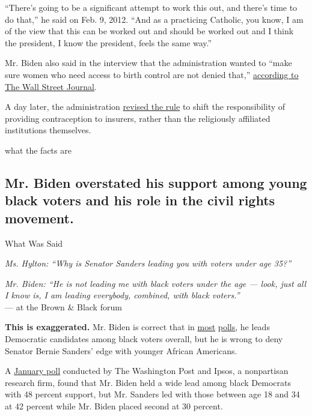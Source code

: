 ``There's going to be a significant attempt to work this out, and
there's time to do that,'' he said on Feb. 9, 2012. ``And as a
practicing Catholic, you know, I am of the view that this can be worked
out and should be worked out and I think the president, I know the
president, feels the same way.''

Mr. Biden also said in the interview that the administration wanted to
``make sure women who need access to birth control are not denied
that,''
\href{https://www.wsj.com/articles/SB10001424052970203646004577213652436066894}{according
to The Wall Street Journal}.

A day later, the administration
\href{https://khn.org/news/obama-contraception-rule-faq/}{revised the
rule} to shift the responsibility of providing contraception to
insurers, rather than the religiously affiliated institutions
themselves.

what the facts are

\hypertarget{mr-biden-overstated-his-support-among-young-black-voters-and-his-role-in-the-civil-rights-movement}{%
\subsection{Mr. Biden overstated his support among young black voters
and his role in the civil rights
movement.}\label{mr-biden-overstated-his-support-among-young-black-voters-and-his-role-in-the-civil-rights-movement}}

What Was Said

\emph{Ms. Hylton: ``Why is Senator Sanders leading you with voters under
age 35?''}

\emph{Mr. Biden: ``He is not leading me with black voters under the age
--- look, just all I know is, I am leading everybody, combined, with
black voters.''}\\
--- at the Brown \& Black forum

\textbf{This is exaggerated.} Mr. Biden is correct that in
\href{https://d25d2506sfb94s.cloudfront.net/cumulus_uploads/document/alq58zq5zt/econTabReport.pdf}{most}
\href{http://www.surveyusa.com/client/PollReport.aspx?g=b4747822-277e-4d2c-b896-eb4e04672c09}{polls},
he leads Democratic candidates among black voters overall, but he is
wrong to deny Senator Bernie Sanders' edge with younger African
Americans.

A
\href{https://www.washingtonpost.com/politics/biden-holds-wide-lead-among-black-voters-in-democratic-presidential-race-post-ipsos-poll-finds/2020/01/11/76ecff08-3325-11ea-a053-dc6d944ba776_story.html}{January
poll} conducted by The Washington Post and Ipsos, a nonpartisan research
firm, found that Mr. Biden held a wide lead among black Democrats with
48 percent support, but Mr. Sanders led with those between age 18 and 34
at 42 percent while Mr. Biden placed second at 30 percent.

